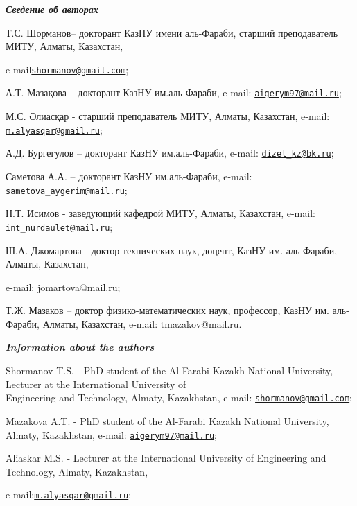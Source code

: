 \begin{authorinfo}
\hspace{1em}\emph{{\bfseries Сведение об авторах}}

Т.С. Шорманов-- докторант КазНУ имени аль-Фараби, старший преподаватель
МИТУ, Алматы, Казахстан,

e-mail\href{mailto:shormanov@gmail.com}{\nolinkurl{shormanov@gmail.com}};

А.Т. Мазақова -- докторант КазНУ им.аль-Фараби, e-mail:
\href{mailto:aigerym97@mail.ru}{\nolinkurl{aigerym97@mail.ru}};

М.С. Әлиасқар - старший преподаватель МИТУ, Алматы, Казахстан, e-mail:
\href{mailto:m.alyasqar@gmail.ru}{\nolinkurl{m.alyasqar@gmail.ru}};

А.Д. Бургегулов -- докторант КазНУ им.аль-Фараби, e-mail:
\href{mailto:dizel_kz@bk.ru}{\nolinkurl{dizel\_kz@bk.ru}};

Саметова А.А. -- докторант КазНУ им.аль-Фараби, e-mail:
\href{mailto:sametova_aygerim@mail.ru}{\nolinkurl{sametova\_aygerim@mail.ru}};

Н.Т. Исимов - заведующий кафедрой МИТУ, Алматы, Казахстан, e-mail:
\href{mailto:int_nurdaulet@mail.ru}{\nolinkurl{int\_nurdaulet@mail.ru}};

Ш.А. Джомартова - доктор технических наук, доцент, КазНУ им. аль-Фараби,
Алматы, Казахстан,

e-mail: jomartova@mail.ru;

Т.Ж. Мазаков -- доктор физико-математических наук, профессор, КазНУ им.
аль-Фараби, Алматы, Казахстан, e-mail: tmazakov@mail.ru.

\hspace{1em}\emph{{\bfseries Information about the authors}}

Shormanov T.S. - PhD student of the Al-Farabi Kazakh National
University, Lecturer at the International University of \\Engineering and
Technology, Almaty, Kazakhstan, e-mail:
\href{mailto:shormanov@gmail.com}{\nolinkurl{shormanov@gmail.com}};

Mazakova A.T. - PhD student of the Al-Farabi Kazakh National University,
Almaty, Kazakhstan, e-mail:
\href{mailto:aigerym97@mail.ru}{\nolinkurl{aigerym97@mail.ru}};

Aliaskar M.S. - Lecturer at the International University of Engineering
and Technology, Almaty, Kazakhstan, 

e-mail:\href{mailto:m.alyasqar@gmail.ru}{\nolinkurl{m.alyasqar@gmail.ru}};


\end{authorinfo}
